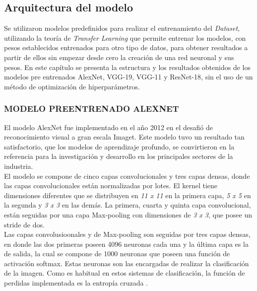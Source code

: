 \subsection{Arquitectura del modelo}

Se utilizaron modelos predefinidos para realizar el entrenamiento del \textit{Dataset}, utilizando la teoría de \textit{Transfer Learning} que permite entrenar los modelos, con pesos establecidos entrenados para otro tipo de datos, para obtener resultados a partir de ellos sin empezar desde cero la creación de una red neuronal y sus pesos. En este capítulo se presenta la estructura y los resultados obtenidos de los modelos pre entrenados AlexNet, VGG-19, VGG-11 y ResNet-18, sin el uso de un método de optimización de hiperparámetros.

\subsubsection{\MakeUppercase{Modelo preentrenado ALEXNET}}

El modelo AlexNet fue implementado en el año 2012 en el desafió de reconocimiento visual a gran escala Imaget. Este modelo tuvo un resultado tan satisfactorio, que los modelos de aprendizaje profundo, se convirtieron en la referencia para la investigación y desarrollo en los principales sectores de la industria. \cite{Pytorch}\\


El modelo se compone de cinco capas convolucionales y tres capas densas, donde las capas convolucionales están normalizadas por lotes. El kernel tiene dimensiones diferentes que se distribuyen en \textit{11 x 11} en la primera capa, \textit{5 x 5} en la segunda y \textit{3 x 3} en las demás. La primera, cuarta y quinta capa convolucional, están seguidas por una capa Max-pooling con dimensiones de \textit{3 x 3}, que posee un stride de dos.\\


Las capas convolusioonales y de Max-pooling son seguidas por tres capas densas, en donde las dos primeras poseen 4096 neuronas cada una y la última capa es la de salida, la cual se compone de 1000 neuronas que poseen una función de activación softmax. Estas neuronas son las encargadas de realizar la clasificación de la imagen. Como es habitual en estos sistemas de clasificación, la función de perdidas implementada es la entropía cruzada \cite{ref_1}.\\

\newpage

